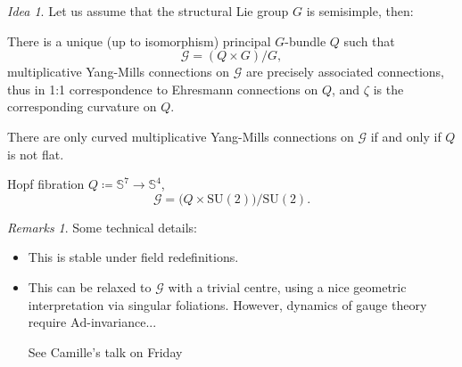 \documentclass[
aspectratio=3218, 
10pt
]{beamer}
\def\bes{\begin{equation*}}
\def\ees{\end{equation*}}
\theoremstyle{plain}
\theoremstyle{remark}
\newtheorem*{remark}{Remarks}
\newtheorem*{idea}{Idea}
\begin{document}
{\begin{frame}
\begin{idea}
Let us assume that the structural Lie group $G$ is semisimple, then:
\end{idea}

\begin{theorem}\vspace{.5pt}
There is a unique (up to isomorphism) principal $G$-bundle $Q$ such that 
\bes
\mathcal{G} = (Q\times G) \Big/ G,
\ees
multiplicative Yang-Mills connections on $\mathcal{G}$ are precisely associated connections, thus in 1:1 correspondence to Ehresmann connections on $Q$, and $\zeta$ is the corresponding curvature on $Q$.
\end{theorem}
\end{frame}


\begin{frame}
\begin{corollary}\vspace{.5pt}
There are only curved multiplicative Yang-Mills connections on $\mathcal{G}$ if and only if $Q$ is not flat.
\end{corollary}

\begin{example}\vspace{.5pt}
Hopf fibration $Q \coloneqq \mathbb{S}^7 \to \mathbb{S}^4$,
\bes
\mathcal{G} = \bigl( Q \times \mathup{SU}(2) \bigr) \Big/ \mathup{SU}(2).
\ees
\end{example}

\pause

\begin{remark}
Some technical details:
\begin{itemize}
	\item This is stable under field redefinitions.
	\item This can be relaxed to $\mathcal{G}$ with a trivial centre, using a nice geometric interpretation via singular foliations. However, dynamics of gauge theory require $\mathup{Ad}$-invariance...
	
	See Camille's talk on Friday \smiley
\end{itemize}
\end{remark}
\end{frame}


}
\end{document}
